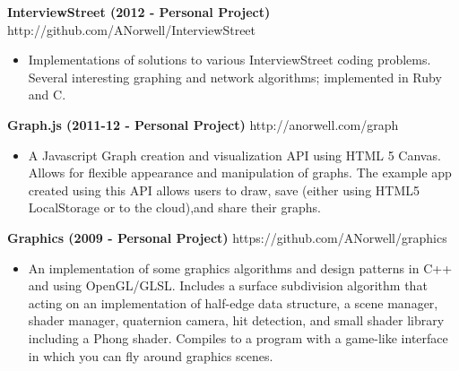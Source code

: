 \documentclass[line,margin]{res}
\begin{document}
\begin{resume}
{\bf InterviewStreet (2012 - Personal Project)} \hfill http://github.com/ANorwell/InterviewStreet
                 \begin{itemize}  \itemsep -2pt %
                 \item Implementations of solutions to various InterviewStreet coding problems. Several interesting graphing and network algorithms; implemented in Ruby and C. 
                \end{itemize}
  
{\bf Graph.js (2011-12 - Personal Project)} \hfill http://anorwell.com/graph
                 \begin{itemize}  \itemsep -2pt %
                 \item A Javascript Graph creation and visualization API using HTML 5 Canvas. Allows for flexible appearance and manipulation of graphs.  The example app created using this API allows users to draw, save (either using HTML5 LocalStorage or to the cloud),and share their graphs. 
                \end{itemize}
  
{\bf Graphics (2009 - Personal Project)} \hfill https://github.com/ANorwell/graphics
                 \begin{itemize}  \itemsep -2pt %
                 \item An implementation of some graphics algorithms and design patterns in C++ and using OpenGL/GLSL. Includes a surface subdivision algorithm that acting on an implementation of half-edge data structure, a scene manager, shader manager, quaternion camera, hit detection, and small shader library including a Phong shader. Compiles to a program with a game-like interface in which you can fly around graphics scenes.
                \end{itemize}
  



\end{resume}
\end{document}
